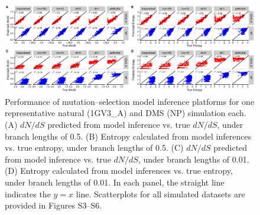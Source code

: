 \documentclass[11pt]{article}
\begin{document}
\vspace{3cm}
\begin{figure}[htbp]
  \centerline{\includegraphics[width=7.5in]{Figures/scatter_dnds_entropy_full.pdf}}
\caption{\label{fig:scatter}
Performance of mutation--selection model inference platforms for one representative natural (1GV3\_A) and DMS (NP) simulation each. (A) $dN/dS$ predicted from model inference vs. true $dN/dS$, under branch lengths of 0.5. (B) Entropy calculated from model inferences vs. true entropy, under branch lengths of 0.5. (C) $dN/dS$ predicted from model inference vs. true $dN/dS$, under branch lengths of 0.01. (D) Entropy calculated from model inferences vs. true entropy, under branch lengths of 0.01. In each panel, the straight line indicates the $y=x$ line. Scatterplots for all simulated datasets are provided in Figures S3--S6.}
\end{figure}
\end{document}
